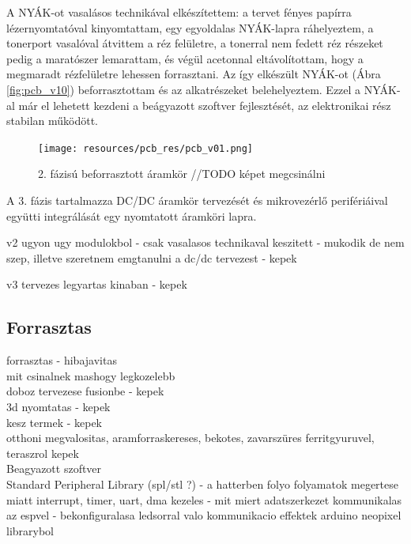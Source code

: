 \documentclass[../main.tex]{subfiles}
\begin{document}
        A NYÁK-ot vasalásos technikával elkészítettem: a tervet fényes papírra lézernyomtatóval kinyomtattam, egy egyoldalas NYÁK-lapra ráhelyeztem, a tonerport vasalóval átvittem a réz felületre, a tonerral nem fedett réz részeket pedig a maratószer lemarattam, és végül acetonnal eltávolítottam, hogy a megmaradt rézfelületre lehessen forrasztani. Az így elkészült NYÁK-ot (Ábra \ref{fig:pcb_v10}) beforrasztottam és az alkatrészeket belehelyeztem. Ezzel a NYÁK-al már el lehetett kezdeni a beágyazott szoftver fejlesztését, az elektronikai rész stabilan működött.
        
        \begin{figure}[h!]
            \centering
                \texttt{[image: resources/pcb\_res/pcb\_v01.png]}
            \caption{2. fázisú beforrasztott áramkör //TODO képet megcsinálni}
            \label{fig:pcb_v01}
        \end{figure}
        
        A 3. fázis tartalmazza DC/DC áramkör tervezését és mikrovezérlő perifériáival együtti integrálását egy nyomtatott áramköri lapra. 
        
        
        
 
 
        

v2 ugyon ugy modulokbol - csak vasalasos technikaval keszitett - mukodik de nem szep, illetve szeretnem emgtanulni a dc/dc tervezest - kepek\

v3 tervezes legyartas kinaban - kepek\\ 

    \subsection{Forrasztas}
forrasztas - hibajavitas\\
mit csinalnek mashogy legkozelebb\\

doboz tervezese fusionbe - kepek\\
3d nyomtatas - kepek\\
kesz termek - kepek\\

otthoni megvalositas, aramforraskereses, bekotes, zavarszüres ferritgyuruvel, teraszrol kepek\\

Beagyazott szoftver\\
Standard Peripheral Library (spl/stl ?) - a hatterben folyo folyamatok megertese miatt
interrupt, timer, uart, dma kezeles - mit miert
adatszerkezet
kommunikalas az espvel - bekonfiguralasa
ledsorral valo kommunikacio
effektek arduino neopixel librarybol 
\end{document}
